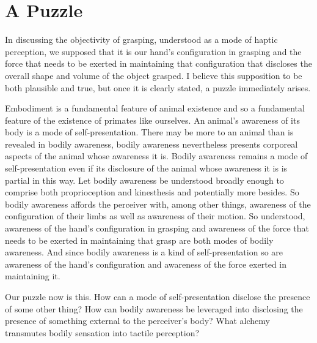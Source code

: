 \documentclass[12pt]{article}
\begin{document}
\section{A Puzzle} %
\label{sec:a_puzzle}


In discussing the objectivity of grasping, understood as a mode of haptic perception, we supposed that it is our hand's configuration in grasping and the force that needs to be exerted in maintaining that configuration that discloses the overall shape and volume of the object grasped. I believe this supposition to be both plausible and true, but once it is clearly stated, a puzzle immediately arises. 

Embodiment is a fundamental feature of animal existence and so a fundamental feature of the existence of primates like ourselves. An animal's awareness of its body is a mode of self-presentation. There may be more to an animal than is revealed in bodily awareness, bodily awareness nevertheless presents corporeal aspects of the animal whose awareness it is. Bodily awareness remains a mode of self-presentation even if its disclosure of the animal whose awareness it is is partial in this way. Let bodily awareness be understood broadly enough to comprise both proprioception and kinesthesis and potentially more besides. So bodily awareness affords the perceiver with, among other things, awareness of the configuration of their limbs as well as awareness of their motion. So understood, awareness of the hand's configuration in grasping and awareness of the force that needs to be exerted in maintaining that grasp are both modes of bodily awareness. And since bodily awareness is a kind of self-presentation so are awareness of the hand's configuration and awareness of the force exerted in maintaining it. 

Our puzzle now is this. How can a mode of self-presentation disclose the presence of some other thing? How can bodily awareness be leveraged into disclosing the presence of something external to the perceiver's body? What alchemy transmutes bodily sensation into tactile perception?
\end{document}
